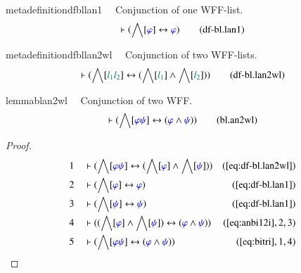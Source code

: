 \begin{restatable}{metadefinition}{dfbllan1}~~ Conjunction of one WFF-list.
\begin{align}
\vdash ( \bigwedge[ \mw{\varphi} ] \leftrightarrow \mw{\varphi}
    )\label{eq:df-bl.lan1}\tag{df-bl.lan1}
\end{align}
\end{restatable}

\begin{restatable}{metadefinition}{dfbllan2wl}~~ Conjunction of two WFF-lists.
\begin{align}
\vdash ( \bigwedge[ \mwl{l_1} \mwl{l_2} ] \leftrightarrow ( \bigwedge[
    \mwl{l_1} ] \wedge \bigwedge[ \mwl{l_2} ] )
    )\label{eq:df-bl.lan2wl}\tag{df-bl.lan2wl}
\end{align}
\end{restatable}

\begin{restatable}{lemma}{blan2wl}~~ Conjunction of two WFF.
\begin{align}
\vdash ( \bigwedge[ \mw{\varphi} \mw{\psi} ] \leftrightarrow ( \mw{\varphi}
    \wedge \mw{\psi} ) )\label{eq:bl.an2wl}\tag{bl.an2wl}
\end{align}
\end{restatable}

\begin{proof}
\begin{align}
  1 &&  & \vdash ( \bigwedge[ \mw{\varphi} \mw{\psi} ] \leftrightarrow (
      \bigwedge[ \mw{\varphi} ] \wedge \bigwedge[ \mw{\psi}
      ] ) )&(\mbox{\ref{eq:df-bl.lan2wl}})\notag
  \\ 2 &&  & \vdash ( \bigwedge[ \mw{\varphi} ] \leftrightarrow \mw{\varphi}
      )&(\mbox{\ref{eq:df-bl.lan1}})\notag
  \\ 3 &&  & \vdash ( \bigwedge[ \mw{\psi} ] \leftrightarrow \mw{\psi}
      )&(\mbox{\ref{eq:df-bl.lan1}})\notag
  \\ 4 &&  & \vdash ( ( \bigwedge[ \mw{\varphi} ] \wedge \bigwedge[ \mw{\psi} ]
      ) \leftrightarrow ( \mw{\varphi} \wedge \mw{\psi} )
      )&(\mbox{\ref{eq:anbi12i}},2,3)\notag
  \\ 5 &&  & \vdash ( \bigwedge[ \mw{\varphi} \mw{\psi} ] \leftrightarrow (
      \mw{\varphi} \wedge \mw{\psi} )
      )&(\mbox{\ref{eq:bitri}},1,4)\notag
\end{align}
\end{proof}

